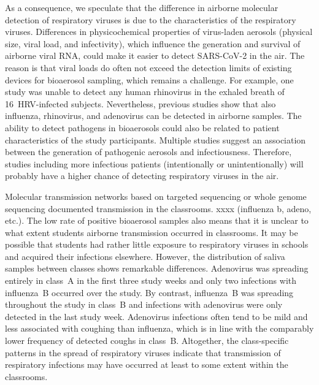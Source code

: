 \documentclass[fleqn,11pt]{wlscirep}
\begin{document}
As a consequence, we speculate that the difference in airborne molecular detection of respiratory viruses is due to the characteristics of the respiratory viruses. Differences in physicochemical properties of virus-laden aerosols (\eg physical size, viral load, and infectivity), which influence the generation and survival of airborne viral RNA\cite{Wang2021,Sattar2016Book}, could make it easier to detect SARS-CoV-2 in the air. The reason is that viral loads do often not exceed the detection limits of existing devices for bioaerosol sampling, which remains a challenge\cite{Wang2021,Belser2023PLOSPath,Bekking2019IORV,Mainelis2020AST}. For example, one study was unable to detect any human rhinovirus in the exhaled breath of 16~HRV-infected subjects\cite{Fabian2011JAMPDD}. Nevertheless, previous studies show that also influenza\cite{Bischoff2013JID,Pan2017mSphere}, rhinovirus\cite{Myatt2004AJRCCM}, and adenovirus\cite{Nguyen2017OFID,Pan2017mSphere} can be detected in airborne samples. The ability to detect pathogens in bioaerosols could also be related to patient characteristics of the study participants. Multiple studies suggest an association between the generation of pathogenic aerosols and infectiousness\cite{Leung2020NatMed,Bischoff2013JID,Escombe2008PLoSMed}. Therefore, studies including more infectious patients (intentionally or unintentionally) will probably have a higher chance of detecting respiratory viruses in the air. 


Molecular transmission networks based on targeted sequencing or whole genome sequencing documented transmission in the classrooms. xxxx (influenza b, adeno, etc.). The low rate of positive bioaerosol samples also means that it is unclear to what extent students airborne transmission occurred in classrooms. It may be possible that students had rather little exposure to respiratory viruses in schools and acquired their infections elsewhere. However, the distribution of saliva samples between classes shows remarkable differences. Adenovirus was spreading entirely in class~A in the first three study weeks and only two infections with influenza~B occurred over the study. By contrast, influenza~B was spreading throughout the study in class~B and infections with adenovirus were only detected in the last study week. Adenovirus infections often tend to be mild\cite{Kunz2010CIDR} and less associated with coughing than influenza\cite{Ma2018RMV}, which is in line with the comparably lower frequency of detected coughs in class~B. Altogether, the class-specific patterns in the spread of respiratory viruses indicate that transmission of respiratory infections may have occurred at least to some extent within the classrooms. 
\end{document}
